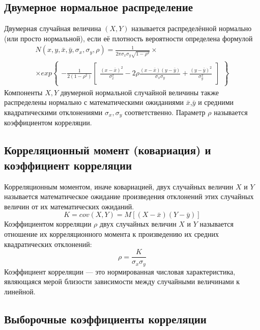 \subsection{Двумерное нормальное распределение}
\noindent Двумерная случайная величина $(X,Y)$ называется распределённой нормально (или просто нормальной), если её плотность вероятности определена формулой
\begin{multline}
N(x, y, \bar{x}, \bar{y}, \sigma_{x}, \sigma_{y}, \rho) = 
\frac{1}{2\pi\sigma_{x}\sigma_{y}\sqrt{1-\rho^{2}}} \times\\
\times
exp{\begin{Bmatrix}
	-\frac{1}{2(1-\rho^{2})}
	\begin{bmatrix}
	\frac{(x-\bar{x})^{2}}{\sigma_{x}^{2}} - 2\rho\frac{(x-\bar{x})(y-\bar{y})}{\sigma_{x}\sigma_{y}} + \frac{(y-\bar{y})^{2}}{\sigma_{y}^{2}}
	\end{bmatrix}
	\end{Bmatrix}}
\end{multline}
Компоненты $X,Y$ двумерной нормальной случайной величины также распределены нормально с математическими ожиданиями $\bar{x}$,$\bar{y}$ и средними квадратическими отклонениями $\sigma_{x},\sigma_{y}$ соответственно.
Параметр $\rho$ называется коэффициентом корреляции.


\subsection{Корреляционный момент (ковариация) и коэффициент корреляции}
\noindent Корреляционным моментом, иначе ковариацией, двух случайных величин $X$ и $Y$ называется математическое ожидание произведения отклонений этих случайных величин от их математических ожиданий.
\begin{equation}
K = cov(X, Y) = M[(X - \bar{x})(Y - \bar{y})]
\label{K}
\end{equation}
Коэффициентом корреляции $\rho$ двух случайных величин $X$ и $Y$ называется отношение их корреляционного момента к произведению их средних квадратических отклонений:
\begin{equation}
\rho = \frac{K}{\sigma_{x}\sigma_{y}}
\label{ro}
\end{equation}
Коэффициент корреляции — это нормированная числовая характеристика, являющаяся мерой близости зависимости между случайными величинами к линейной.

\subsection{Выборочные коэффициенты корреляции}
